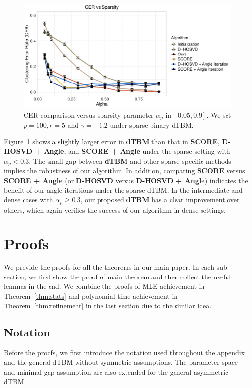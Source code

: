 \documentclass[journal]{IEEEtran}
\theoremstyle{definition}
\theoremstyle{definition}
\begin{document}
\begin{figure}[htp!]
    \centering
    \includegraphics[width=1\columnwidth]{sparsity.pdf}
    \caption{CER comparison versus sparsity parameter $\alpha_p$ in $[0.05, 0.9]$. We set $p = 100, r = 5$ and $\gamma = -1.2$ under sparse binary dTBM.}
    \label{fig:sparse}
\end{figure}

  
Figure~\ref{fig:sparse} shows a slightly larger error in \textbf{\small dTBM} than that in \textbf{\small SCORE}, \textbf{\small D-HOSVD + Angle}, and \textbf{\small SCORE + Angle} under the sparse setting with $\alpha_p < 0.3$. 
The small gap between  \textbf{\small dTBM} and other sparse-specific methods implies the robustness of our algorithm. In addition, comparing \textbf{\small SCORE} versus \textbf{\small SCORE + Angle} (or \textbf{\small D-HOSVD} versus \textbf{\small D-HOSVD + Angle}) indicates the benefit of our angle iterations under the sparse dTBM. In the intermediate and dense cases with $\alpha_p \geq 0.3$, our proposed \textbf{\small dTBM} has a clear improvement over others, which again verifies the success of our algorithm in dense settings.

\section{Proofs}

We provide the proofs for all the theorems in our main paper. In each sub-section, we first show the proof of main theorem and then collect the useful lemmas in the end.   {We combine the proofs of MLE achievement in Theorem~\ref{thm:stats} and polynomial-time achievement in Theorem~\ref{thm:refinement} in the last section due to the similar idea. }

\subsection{Notation}
Before the proofs, we first introduce the notation used throughout the appendix and the general dTBM without symmetric assumptions. The parameter space and minimal gap assumption are also extended for the general asymmetric dTBM.
\end{document}
